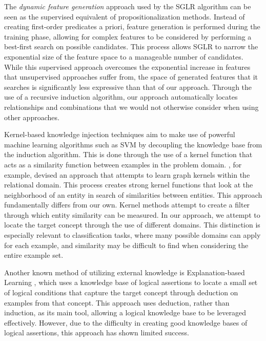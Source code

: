 \documentclass[twoside,11pt]{article}
\theoremstyle{definition}
\begin{document}
The \emph{dynamic feature generation} approach used by the SGLR algorithm \cite{popescul200716} can be seen as the supervised equivalent of propositionalization methods. Instead of creating first-order predicates a priori, feature generation is performed during the training phase, allowing for complex features to be considered by performing a best-first search on possible candidates.
This process allows SGLR to narrow the exponential size of the feature space to a manageable number of candidates.
While this supervised approach overcomes the exponential increase in features that unsupervised approaches suffer from, the space of generated features that it searches is significantly less expressive than that of our approach.
Through the use of a recursive induction algorithm, our approach automatically locates relationships and combinations that we would not otherwise consider when using other approaches.

Kernel-based knowledge injection techniques aim to make use of powerful machine learning algorithms such as SVM by decoupling the knowledge base from the induction algorithm. This is done through the use of a kernel function that acts as a similarity function between examples in the problem domain. , for example, devised an approach that attempts to learn graph kernels within the relational domain. This process creates strong kernel functions that look at the neighborhood of an entity in search of similarities between entities. This  approach fundamentally differs from our own. Kernel methods attempt to create a filter through which entity similarity can be measured. In our approach, we attempt to locate the target concept through the use of different domains. This distinction is especially relevant to classification tasks, where many possible domains can apply for each example, and similarity may be difficult to find when considering the entire example set.

Another known method of utilizing external knowledge is Explanation-based Learning , which uses a knowledge base of logical assertions to locate a small set of logical conditions that capture the target concept through deduction on examples from that concept. This approach uses deduction, rather than induction, as its main tool, allowing a logical knowledge base to be leveraged effectively.
However, due to the difficulty in creating good knowledge bases of logical assertions, this approach has shown limited success.
\end{document}
